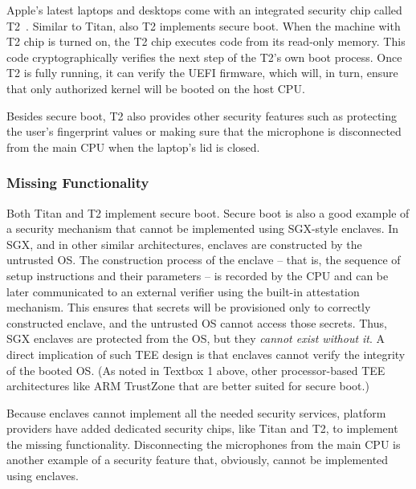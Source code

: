 Apple's latest laptops and desktops come with an integrated security chip called T2~\cite{t2}. Similar to Titan, also T2 implements secure boot. When the machine with T2 chip is turned on, the T2 chip executes code from its read-only memory. This code cryptographically verifies the next step of the T2's own boot process. Once T2 is fully running, it can verify the UEFI firmware, which will, in turn, ensure that only authorized kernel will be booted on the host CPU.

Besides secure boot, T2 also provides other security features such as protecting the user's fingerprint values or making sure that the microphone is disconnected from the main CPU when the laptop's lid is closed. 
 
 
\subsubsection*{Missing Functionality}
  
Both Titan and T2 implement secure boot. Secure boot is also a good example of a security mechanism that cannot be implemented using SGX-style enclaves. 
%
In SGX, and in other similar architectures, enclaves are constructed by the untrusted OS. The construction process of the enclave -- that is, the sequence of setup instructions and their parameters -- is recorded by the CPU and can be later communicated to an external verifier using the built-in attestation mechanism. This ensures that secrets will be provisioned only to correctly constructed enclave, and the untrusted OS cannot access those secrets. Thus, SGX enclaves are protected from the OS, but they \emph{cannot exist without it}. A direct implication of such TEE design is that enclaves cannot verify the integrity of the booted OS. (As noted in Textbox 1 above, other processor-based TEE architectures like ARM TrustZone that are better suited for secure boot.)

Because enclaves cannot implement all the needed security services, platform providers have added dedicated security chips, like Titan and T2, to implement the missing functionality. Disconnecting the microphones from the main CPU is another example of a security feature that, obviously, cannot be implemented using enclaves.

